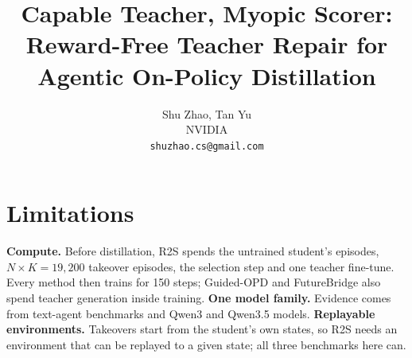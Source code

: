 \documentclass{article}
\title{Capable Teacher, Myopic Scorer:\\Reward-Free Teacher Repair for Agentic On-Policy Distillation}
\author{Shu Zhao, Tan Yu \\
NVIDIA \\
\texttt{shuzhao.cs@gmail.com}}
\newcommand{\method}{R2S\xspace}
\begin{document}
\maketitle
{}










\section*{Limitations}
\textbf{Compute.} Before distillation, \method{} spends the untrained student's episodes, $N{\times}K=19{,}200$ takeover episodes, the selection step and one teacher fine-tune. Every method then trains for 150 steps; Guided-OPD and FutureBridge also spend teacher generation inside training. \textbf{One model family.} Evidence comes from text-agent benchmarks and Qwen3 and Qwen3.5 models. \textbf{Replayable environments.} Takeovers start from the student's own states, so \method{} needs an environment that can be replayed to a given state; all three benchmarks here can.




\appendix
{}

\end{document}
